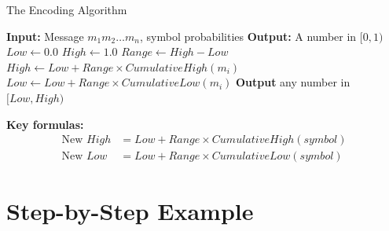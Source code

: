 \documentclass[aspectratio=169,12pt]{beamer}
\begin{document}
\begin{frame}{The Encoding Algorithm}
    \begin{algorithm}[H]
        \caption{Arithmetic Encoding}
        \begin{algorithmic}[1]
            \STATE \textbf{Input:} Message $m_1 m_2 \ldots m_n$, symbol probabilities
            \STATE \textbf{Output:} A number in $[0, 1)$
            \STATE
            \STATE $Low \leftarrow 0.0$
            \STATE $High \leftarrow 1.0$
                \STATE $Range \leftarrow High - Low$
                \STATE $High \leftarrow Low + Range \times CumulativeHigh(m_i)$
                \STATE $Low \leftarrow Low + Range \times CumulativeLow(m_i)$
            \ENDFOR
            \STATE \textbf{Output} any number in $[Low, High)$
        \end{algorithmic}
    \end{algorithm}
    
    \vspace{0.3cm}
    \textbf{Key formulas:}
    \begin{align*}
        \text{New } High &= Low + Range \times CumulativeHigh(symbol) \\
        \text{New } Low &= Low + Range \times CumulativeLow(symbol)
    \end{align*}
\end{frame}


\section{Step-by-Step Example}
\end{document}
